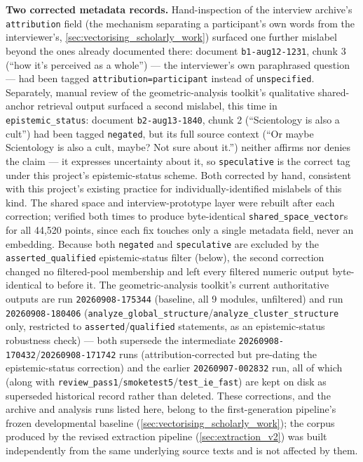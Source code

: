 \textbf{Two corrected metadata records.} Hand-inspection of the interview archive's \texttt{attribution} field (the mechanism separating a participant's own words from the interviewer's, \ref{sec:vectorising_scholarly_work}) surfaced one further mislabel beyond the ones already documented there: document \texttt{b1-aug12-1231}, chunk 3 (\enquote{how it's perceived as a whole}) — the interviewer's own paraphrased question — had been tagged \texttt{attribution=participant} instead of \texttt{unspecified}. Separately, manual review of the geometric-analysis toolkit's qualitative shared-anchor retrieval output surfaced a second mislabel, this time in \texttt{epistemic\_status}: document \texttt{b2-aug13-1840}, chunk 2 (\enquote{Scientology is also a cult}) had been tagged \texttt{negated}, but its full source context (\enquote{Or maybe Scientology is also a cult, maybe? Not sure about it.}) neither affirms nor denies the claim — it expresses uncertainty about it, so \texttt{speculative} is the correct tag under this project's epistemic-status scheme. Both corrected by hand, consistent with this project's existing practice for individually-identified mislabels of this kind. The shared space and interview-prototype layer were rebuilt after each correction; verified both times to produce byte-identical \texttt{shared\_space\_vector}s for all 44{,}520 points, since each fix touches only a single metadata field, never an embedding. Because both \texttt{negated} and \texttt{speculative} are excluded by the \texttt{asserted\_qualified} epistemic-status filter (below), the second correction changed no filtered-pool membership and left every filtered numeric output byte-identical to before it. The geometric-analysis toolkit's current authoritative outputs are run \texttt{20260908-175344} (baseline, all 9 modules, unfiltered) and run \texttt{20260908-180406} (\texttt{analyze\_global\_structure}/\texttt{analyze\_cluster\_structure} only, restricted to \texttt{asserted}/\texttt{qualified} statements, as an epistemic-status robustness check) — both supersede the intermediate \texttt{20260908-170432}/\texttt{20260908-171742} runs (attribution-corrected but pre-dating the epistemic-status correction) and the earlier \texttt{20260907-002832} run, all of which (along with \texttt{review\_pass1}/\texttt{smoketest5}/\texttt{test\_ie\_fast}) are kept on disk as superseded historical record rather than deleted. These corrections, and the archive and analysis runs listed here, belong to the first-generation pipeline's frozen developmental baseline (\ref{sec:vectorising_scholarly_work}); the corpus produced by the revised extraction pipeline (\ref{sec:extraction_v2}) was built independently from the same underlying source texts and is not affected by them.

